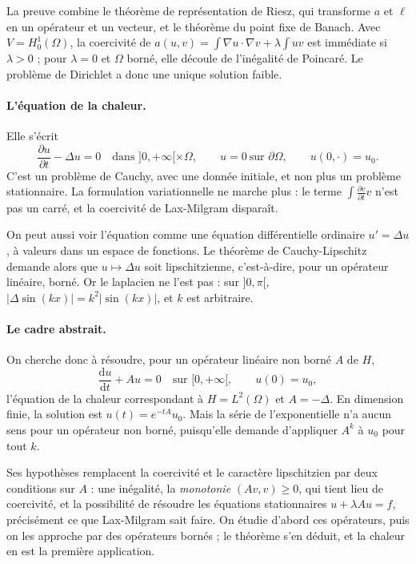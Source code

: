 \documentclass[11pt,a4paper]{article}
\theoremstyle{plain}
\theoremstyle{definition}
\theoremstyle{remark}
\begin{document}
La preuve combine le théorème de représentation de Riesz, qui transforme $a$ et $\ell$ en un opérateur et un vecteur, et le théorème du point fixe de Banach. Avec $V=H^1_0(\Omega)$, la coercivité de $a(u,v)=\int\nabla u\cdot\nabla v+\lambda\int uv$ est immédiate si $\lambda>0$ ; pour $\lambda=0$ et $\Omega$ borné, elle découle de l'inégalité de Poincaré. Le problème de Dirichlet a donc une unique solution faible.

\paragraph{L'équation de la chaleur.} Elle s'écrit
\[
  \frac{\partial u}{\partial t}-\Delta u=0\quad\text{dans }]0,+\infty[\times\Omega,\qquad u=0\ \text{sur }\partial\Omega,\qquad u(0,\cdot)=u_0 .
\]
C'est un problème de Cauchy, avec une donnée initiale, et non plus un problème stationnaire. La formulation variationnelle ne marche plus : le terme $\int\frac{\partial v}{\partial t}v$ n'est pas un carré, et la coercivité de Lax-Milgram disparaît.

On peut aussi voir l'équation comme une équation différentielle ordinaire $u'=\Delta u$, à valeurs dans un espace de fonctions. Le théorème de Cauchy-Lipschitz demande alors que $u\mapsto\Delta u$ soit lipschitzienne, c'est-à-dire, pour un opérateur linéaire, borné. Or le laplacien ne l'est pas : sur $]0,\pi[$, $|\Delta\sin(kx)|=k^2|\sin(kx)|$, et $k$ est arbitraire.

\paragraph{Le cadre abstrait.} On cherche donc à résoudre, pour un opérateur linéaire non borné $A$ de $H$,
\begin{equation}\label{eq:evol}
  \frac{\mathrm{d}u}{\mathrm{d}t}+Au=0\quad\text{sur }[0,+\infty[,\qquad u(0)=u_0 ,
\end{equation}
l'équation de la chaleur correspondant à $H=L^2(\Omega)$ et $A=-\Delta$. En dimension finie, la solution est $u(t)=e^{-tA}u_0$. Mais la série de l'exponentielle n'a aucun sens pour un opérateur non borné, puisqu'elle demande d'appliquer $A^k$ à $u_0$ pour tout $k$.

Ses hypothèses remplacent la coercivité et le caractère lipschitzien par deux conditions sur $A$ : une inégalité, la \emph{monotonie} $(Av,v)\geq0$, qui tient lieu de coercivité, et la possibilité de résoudre les équations stationnaires $u+\lambda Au=f$, précisément ce que Lax-Milgram sait faire. On étudie d'abord ces opérateurs, puis on les approche par des opérateurs bornés ; le théorème s'en déduit, et la chaleur en est la première application.
\end{document}
